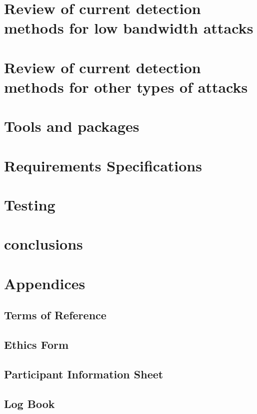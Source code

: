 \documentclass[11pt,twoside]{book}
\begin{document}
\frontmatter




\tableofcontents

\mainmatter

\part{Review of current detection methods for low bandwidth attacks}



\part{Review of current detection methods for other types of attacks}



\part{Tools and packages}
\part{Requirements Specifications}
\part{Testing}
\part{conclusions}
\printbibliography


\part{Appendices}
\appendix
\chapter{Terms of Reference}
\chapter{Ethics Form}

\chapter{Participant Information Sheet}


\chapter{Log Book}

\end{document}
